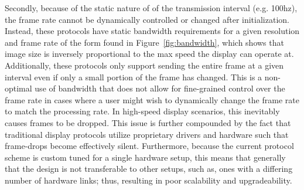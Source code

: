     Secondly, because of the static nature of of the transmission interval (e.g. 100hz), the frame rate cannot be dynamically controlled or changed after initialization. Instead, these protocols have static bandwidth requirements for a given resolution and frame rate of the form found in Figure~\ref{fig:bandwidth}, which shows that image size is inversely proportional to the max speed the display can operate at. Additionally, these protocols only support sending the entire frame at a given interval even if only a small portion of the frame has changed. This is a non-optimal use of bandwidth that does not allow for fine-grained control over the frame rate in cases where a user might wish to dynamically change the frame rate to match the processing rate. In high-speed display scenarios, this inevitably causes frames to be dropped. This issue is further compounded by the fact that traditional display protocols utilize proprietary drivers and hardware such that frame-drops become effectively silent.  Furthermore, because the current protocol scheme is custom tuned for a single hardware setup, this means that generally that the design is not transferable to other setups, such as, ones with a differing number of hardware links; thus, resulting in poor scalability and upgradeability.


